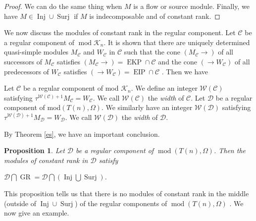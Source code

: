 \documentclass[a4paper,12pt]{amsart}
\newcommand{\cC}{\mathcal{C}}
\newcommand{\cD}{\mathcal{D}}
\newcommand{\cK}{\mathcal{K}}
\newcommand{\cW}{\mathcal{W}}
\DeclareMathOperator{\modd}{mod}
\DeclareMathOperator{\EIP}{EIP}
\DeclareMathOperator{\Inj}{Inj}
\DeclareMathOperator{\Sur}{Surj}
\DeclareMathOperator{\EKP}{EKP}
\DeclareMathOperator{\GR}{GR}
\newtheorem{proposition}{Proposition}[section]
\newenvironment{Definition}[1][Definition.]{\begin{trivlist}
\item[\hskip \labelsep {\bfseries #1}]}{\end{trivlist}}
\begin{document}
\begin{proof}
  We can do the same thing when $M$ is a flow or source module. Finally, we have $M\in \Inj \cup \Sur$ if $M$ is indecomposable and of constant rank.





 




\end{proof}

We now discuss the modules of constant rank in the   regular component. Let $\cC$ be a regular component of $\modd\cK_n$. It is shown that there are uniquely determined quasi-simple modules $M_{\cC}$ and $W_{\cC}$ in $\cC$ such that the cone $(M_{\cC}\rightarrow)$ of all successors of $M_{\cC}$ satisfies $(M_{\cC}\rightarrow)= \EKP\cap \cC$ and the cone $(\rightarrow W_{\cC})$ of all predecessors of $W_{\cC}$ satisfies $(\rightarrow W_{\cC})=\EIP \cap \cC$ \cite[Theorem 3.3]{Julia}. Then we have

 
\begin{Definition}
Let $\cC$ be a regular component of mod $\mathcal{K}_n$. We  define  an integer $\cW(\cC)$  satisfying $\tau^{\cW(\cC)+1}M_{\cC}=W_{\cC}$.  We call $\cW(\cC)$  the \textit{width} of $\cC$. Let $\cD$ be a regular component of mod$(T(n), \Omega)$. We similarly have an integer $\cW(\cD)$  satisfying $\tau^{\cW(\cD)+1}M_{\cD}=W_{\cD}$. We call $\cW(\cD)$  the \textit{width} of $\cD$.


\end{Definition}

By Theorem \ref{es}, we have an important conclusion.
\begin{proposition}
Let $\cD$ be a regular component of $\modd(T(n),\Omega)$. Then the modules of constant rank in $\cD$ satisfy 

\begin{center}
$\cD\bigcap \GR=\cD\bigcap (\Inj\bigcup \Sur)$.
\end{center}

\end{proposition}

This proposition tells us that there is no modules of constant rank in the middle (outside of $\Inj\cup \Sur$) of the regular components of $\modd(T(n),\Omega)$ \cite[Theorem 3.7]{Jie2}. We now give an example.
\end{document}
